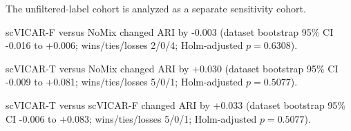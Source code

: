 

The unfiltered-label cohort is analyzed as a separate sensitivity cohort.

scVICAR-F versus NoMix changed ARI by -0.003 (dataset bootstrap 95\% CI -0.016 to +0.006; wins/ties/losses 2/0/4; Holm-adjusted $p=0.6308$).

scVICAR-T versus NoMix changed ARI by +0.030 (dataset bootstrap 95\% CI -0.009 to +0.081; wins/ties/losses 5/0/1; Holm-adjusted $p=0.5077$).

scVICAR-T versus scVICAR-F changed ARI by +0.033 (dataset bootstrap 95\% CI -0.006 to +0.083; wins/ties/losses 5/0/1; Holm-adjusted $p=0.5077$).
